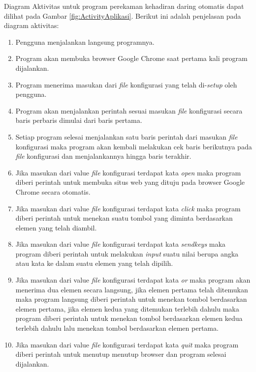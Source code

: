 Diagram Aktivitas untuk program perekaman kehadiran daring otomatis dapat dilihat pada Gambar \ref{fig:ActivityAplikasi}. Berikut ini adalah penjelasan pada diagram aktivitas:
\begin{enumerate}
	\item Pengguna menjalankan langsung programnya.
	\item Program akan membuka browser Google Chrome saat pertama kali program dijalankan.
	\item Program menerima masukan dari \textit{file} konfigurasi yang telah di-\textit{setup} oleh pengguna.
	\item Program akan menjalankan perintah sesuai masukan \textit{file} konfigurasi secara baris perbaris dimulai dari baris pertama.
	\item Setiap program selesai menjalankan satu baris perintah dari masukan \textit{file} konfigurasi maka program akan kembali melakukan cek baris berikutnya pada \textit{file} konfigurasi dan menjalankannya hingga baris terakhir.
	\item Jika masukan dari value \textit{file} konfigurasi terdapat kata \textit{open} maka program diberi perintah untuk membuka situs web yang dituju pada browser Google Chrome secara otomatis.
	\item Jika masukan dari value \textit{file} konfigurasi terdapat kata \textit{click} maka program diberi perintah untuk menekan suatu tombol yang diminta berdasarkan elemen yang telah diambil.
	\item Jika masukan dari value \textit{file} konfigurasi terdapat kata \textit{sendkeys} maka program diberi perintah untuk melakukan \textit{input} suatu nilai berupa angka atau kata ke dalam suatu elemen yang telah dipilih.
	\item Jika masukan dari value \textit{file} konfigurasi terdapat kata \textit{or} maka program akan menerima dua elemen secara langsung, jika elemen pertama telah ditemukan maka program langsung diberi perintah untuk menekan tombol berdasarkan elemen pertama, jika elemen kedua yang ditemukan terlebih dahulu maka program diberi perintah untuk menekan tombol berdasarkan elemen kedua terlebih dahulu lalu menekan tombol berdasarkan elemen pertama.
	\item Jika masukan dari value \textit{file} konfigurasi terdapat kata \textit{quit} maka program diberi perintah untuk menutup menutup browser dan program selesai dijalankan.

\end{enumerate}
